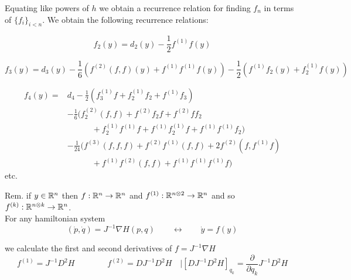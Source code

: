 \documentclass[12pt]{article}
\begin{document}
Equating like powers of $h$ we obtain a recurrence relation for finding $f_n$ in terms of $\{f_i\}_{i<n}$. We obtain the following recurrence relations:

\begin{equation}\label{eq:f_2}
    f_2(y) = d_2(y) - \frac{1}{2} f^{(1)} f(y)
\end{equation}

\begin{equation}\label{eq:f_3}
    f_3(y) = d_3(y) - \frac{1}{6}\left( f^{(2)} (f , f)(y) + f^{(1)} f^{(1)} f(y) \right) - \frac{1}{2}\left( f^{(1)} f_2(y) + f_2^{(1)}  f(y) \right)
\end{equation}

\begin{equation}\label{eq:f_4}
\begin{split}
    f_4(y) = & d_4 - \frac{1}{2}\left( f_3^{(1)} f + f_2^{(1)} f_2 + f^{(1)} f_3 \right)\\
             & - \frac{1}{6}\Big( f_2^{(2)}(f,f) + f^{(2)}f_2 f + f^{(2)} f f_2\\
             & \qquad\quad + f_2^{(1)} f^{(1)} f + f^{(1)}f_2^{(1)}f + f^{(1)}f^{(1)}f_2
             \Big)\\
             & - \frac{1}{24}\Big(
             f^{(3)}(f,f,f) + f^{(2)}f^{(1)}(f,f) + 2 f^{(2)}(f,f^{(1)}f) \\
             &\qquad\quad + f^{(1)}f^{(2)}(f,f) + f^{(1)}f^{(1)}f^{(1)}f
             \Big)
\end{split}
\end{equation}
etc.

Rem. if $y\in\mathbb{R}^n$ then $f:\mathbb{R}^n \to \mathbb{R}^n$ and $f^{(1)}:\mathbb{R}^{n \otimes 2}\to\mathbb{R}^n$ and so $f^{(k)} : \mathbb{R}^{n\otimes k}\to\mathbb{R}^n$. \\

For any hamiltonian system 
\begin{equation}\label{eq:hamiltonian system ode}
    (\dot p,\dot q) = J^{-1}\nabla H(p,q) \qquad \leftrightarrow \qquad \dot y = f(y)
\end{equation}

we calculate the first and second derivatives of $f = J^{-1}\nabla H$
\begin{equation}\label{eq:first and second derivatives of gradient hamiltonian}
    f^{(1)} = J^{-1}D^2 H \qquad\qquad f^{(2)} = D J^{-1}D^2 H\quad \Big| \left[ DJ^{-1}D^2H \right]_{q_k} = \frac{\partial}{\partial q_k} J^{-1}D^2H
\end{equation}
\end{document}
